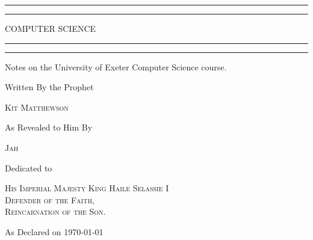 \documentclass[twoside]{report}
\begin{document}
\begin{titlepage}

    \centering
    \vspace*{\baselineskip}

    \rule{\textwidth}{1.6pt}\vspace*{-\baselineskip}\vspace*{2pt}
    \rule{\textwidth}{0.4pt}

    \vspace{0.75\baselineskip}

    {\scshape\LARGE COMPUTER SCIENCE}

    \rule{\textwidth}{0.4pt}\vspace*{-\baselineskip}\vspace{3.2pt}
    \rule{\textwidth}{1.6pt}

    \vspace{2\baselineskip}

    Notes on the University of Exeter Computer Science course.

    \vspace*{5\baselineskip}

    Written By the Prophet

    \vspace{0.5\baselineskip}

    {\scshape\Large Kit Matthewson}

    \vspace{1\baselineskip}

    As Revealed to Him By

    \vspace{0.5\baselineskip}

    {\scshape\Large Jah}

    \vspace{10\baselineskip}

    Dedicated to

        {\scshape\normalsize His Imperial Majesty King Haile Selassie I\\Defender of the Faith,\\Reincarnation of the Son.}

    \vspace{12\baselineskip}

    As Declared on \today

\end{titlepage}

\tableofcontents





\end{document}
